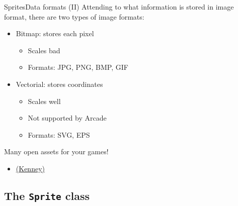 \documentclass[10pt,compress]{beamer} %
\begin{document}
\begin{frame}{Sprites}{Data formats (II)}
    Attending to what information is stored in image format, there are two types of image formats:
        \begin{itemize}
            \item Bitmap: stores each pixel
                \begin{itemize}
                \item Scales bad
                \item Formats: JPG, PNG, BMP, GIF
                \end{itemize}

            \item Vectorial: stores coordinates
                \begin{itemize}
                \item Scales well
                \item Not supported by Arcade
                \item Formats: SVG, EPS
                \end{itemize}
	    \end{itemize}

    Many open assets for your games!
        \begin{itemize}
        \item \href{https://kenney.nl/assets}{(Kenney)}
        \end{itemize}
\end{frame}

\subsection{The \texttt{Sprite} class}
\end{document}
